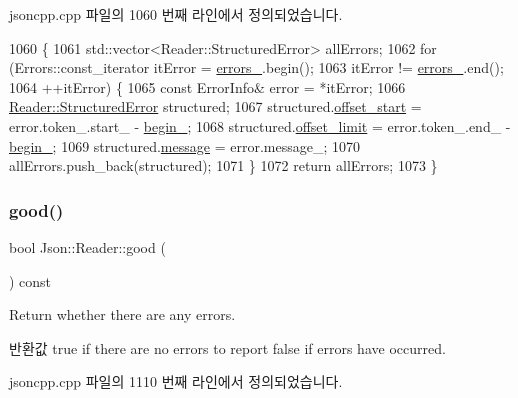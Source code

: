 jsoncpp.\+cpp 파일의 1060 번째 라인에서 정의되었습니다.


\begin{DoxyCode}
1060                                                                    \{
1061   std::vector<Reader::StructuredError> allErrors;
1062   \textcolor{keywordflow}{for} (Errors::const\_iterator itError = \hyperlink{class_json_1_1_reader_a1bbce45dc4df753bed60c129f4b5147c}{errors\_}.begin();
1063        itError != \hyperlink{class_json_1_1_reader_a1bbce45dc4df753bed60c129f4b5147c}{errors\_}.end();
1064        ++itError) \{
1065     \textcolor{keyword}{const} ErrorInfo& error = *itError;
1066     \hyperlink{struct_json_1_1_reader_1_1_structured_error}{Reader::StructuredError} structured;
1067     structured.\hyperlink{struct_json_1_1_reader_1_1_structured_error_ac98af0da2d704be4b64a9572a682423b}{offset\_start} = error.token\_.start\_ - \hyperlink{class_json_1_1_reader_a327166839022ea91f0a8290960a8af76}{begin\_};
1068     structured.\hyperlink{struct_json_1_1_reader_1_1_structured_error_ad76ac01aeb0ada7e882c2df5daa54c6e}{offset\_limit} = error.token\_.end\_ - \hyperlink{class_json_1_1_reader_a327166839022ea91f0a8290960a8af76}{begin\_};
1069     structured.\hyperlink{struct_json_1_1_reader_1_1_structured_error_a2d2dc387aefe406a71de3daa263a38f4}{message} = error.message\_;
1070     allErrors.push\_back(structured);
1071   \}
1072   \textcolor{keywordflow}{return} allErrors;
1073 \}
\end{DoxyCode}
\mbox{\label{class_json_1_1_reader_a86cbb42b3e6d4a4d6416473b1a8f6ae7}} 
\subsubsection{\texorpdfstring{good()}{good()}}
{\footnotesize\ttfamily bool Json\+::\+Reader\+::good (\begin{DoxyParamCaption}{ }\end{DoxyParamCaption}) const}



Return whether there are any errors. 

\begin{DoxyReturn}{반환값}
{\ttfamily true} if there are no errors to report {\ttfamily false} if errors have occurred. 
\end{DoxyReturn}


jsoncpp.\+cpp 파일의 1110 번째 라인에서 정의되었습니다.


